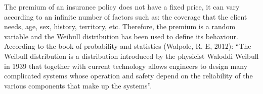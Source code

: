 \documentclass[review]{elsarticle}
\begin{document}
The premium of an insurance policy does not have a fixed price, it can vary according to an infinite number of factors such as: the coverage that the client needs, age, sex, history, territory, etc. Therefore, the premium is a random variable and the Weibull distribution has been used to define its behaviour.
According to the book of probability and statistics (Walpole, R. E, 2012): “The Weibull distribution is a distribution introduced by the physicist Waloddi Weibull in 1939 that together with current technology allows engineers to design many complicated systems whose operation and safety depend on the reliability of the various components that make up the systems”.
\end{document}
